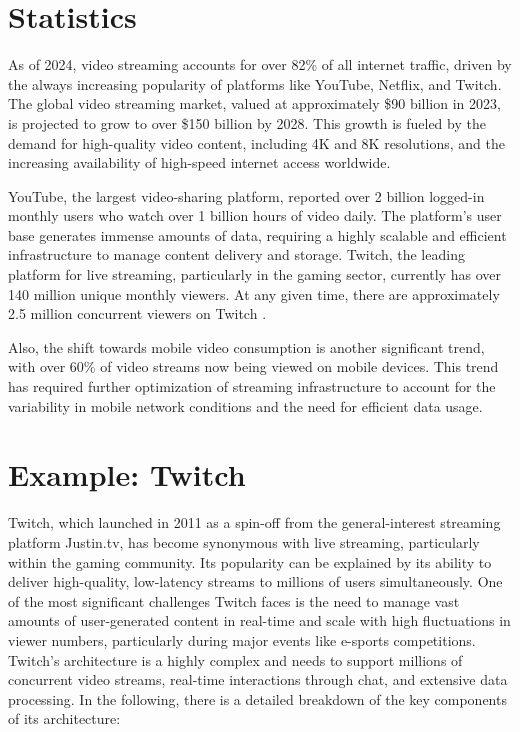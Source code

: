 \section{Statistics}
As of 2024, video streaming accounts for over 82\% of all internet traffic, driven by the always increasing popularity of platforms like YouTube, Netflix, and Twitch\cite{cisco_vni}. The global video streaming market, valued at approximately \$90 billion in 2023, is projected to grow to over \$150 billion by 2028\cite{grandview_research}. This growth is fueled by the demand for high-quality video content, including 4K and 8K resolutions, and the increasing availability of high-speed internet access worldwide.

YouTube, the largest video-sharing platform, reported over 2 billion logged-in monthly users who watch over 1 billion hours of video daily\cite{youtube_stats}. The platform's user base generates immense amounts of data, requiring a highly scalable and efficient infrastructure to manage content delivery and storage. Twitch, the leading platform for live streaming, particularly in the gaming sector, currently has over 140 million unique monthly viewers. At any given time, there are approximately 2.5 million concurrent viewers on Twitch \cite{twitch_stats}.

Also, the shift towards mobile video consumption is another significant trend, with over 60\% of video streams now being viewed on mobile devices\cite{mobile_video}. This trend has required further optimization of streaming infrastructure to account for the variability in mobile network conditions and the need for efficient data usage.

\section{Example: Twitch}
Twitch, which launched in 2011 as a spin-off from the general-interest streaming platform Justin.tv, has become synonymous with live streaming, particularly within the gaming community. Its popularity can be explained by its ability to deliver high-quality, low-latency streams to millions of users simultaneously. 
One of the most significant challenges Twitch faces is the need to manage vast amounts of user-generated content in real-time and scale with high fluctuations in viewer numbers, particularly during major events like e-sports competitions\cite{twitch_aws}.
Twitch's architecture is a highly complex and needs to support millions of concurrent video streams, real-time interactions through chat, and extensive data processing. In the following, there is a detailed breakdown of the key components of its architecture:

